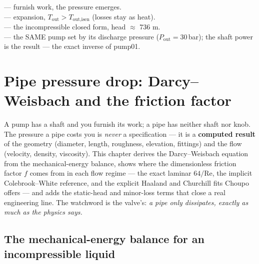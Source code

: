 \documentclass[11pt,a4paper]{article}
\begin{document}
\begin{tutoriallink}
 --- furnish work, the pressure
emerges. \\
 --- expansion, $T_{\text{out}} >
T_{\text{out,isen}}$ (losses stay as heat). \\
 --- the incompressible closed
form, head $\approx$ 736 m. \\
 --- the SAME pump set by
its discharge pressure ($P_{\text{out}}=30$\,bar); the shaft power is the
result --- the exact inverse of pump01.
\end{tutoriallink}

\section{Pipe pressure drop: Darcy--Weisbach and the friction
factor}\label{ch:hydraulics}

\begin{whatyoulllearn}
A pump has a shaft and you furnish its work; a pipe has neither shaft nor
knob.  The pressure a pipe costs you is \emph{never} a specification --- it
is a \textbf{computed result} of the geometry (diameter, length, roughness,
elevation, fittings) and the flow (velocity, density, viscosity).  This
chapter derives the Darcy--Weisbach equation from the mechanical-energy
balance, shows where the dimensionless friction factor $f$ comes from in
each flow regime --- the exact laminar $64/\mathrm{Re}$, the implicit
Colebrook--White reference, and the explicit Haaland and Churchill fits
Choupo offers --- and adds the static-head and minor-loss terms that close
a real engineering line.  The watchword is the valve's: \emph{a pipe only
dissipates, exactly as much as the physics says.}
\end{whatyoulllearn}

\subsection{The mechanical-energy balance for an incompressible liquid}
\end{document}
